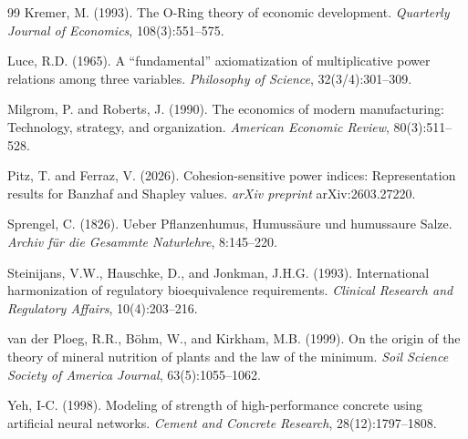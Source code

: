 \documentclass[12pt, a4paper]{article}
\theoremstyle{definition}
\theoremstyle{remark}
\begin{document}
\begin{thebibliography}{99}
Kremer, M. (1993). The O-Ring theory of economic development. \textit{Quarterly Journal of Economics}, 108(3):551--575.

Luce, R.D. (1965). A ``fundamental'' axiomatization of multiplicative power relations among three variables. \textit{Philosophy of Science}, 32(3/4):301--309.

Milgrom, P. and Roberts, J. (1990). The economics of modern manufacturing: Technology, strategy, and organization. \textit{American Economic Review}, 80(3):511--528.

Pitz, T. and Ferraz, V. (2026). Cohesion-sensitive power indices: Representation results for Banzhaf and Shapley values. \textit{arXiv preprint} arXiv:2603.27220.

Sprengel, C. (1826). Ueber Pflanzenhumus, Humuss\"aure und humussaure Salze. \textit{Archiv f\"ur die Gesammte Naturlehre}, 8:145--220.

Steinijans, V.W., Hauschke, D., and Jonkman, J.H.G. (1993). International harmonization of regulatory bioequivalence requirements. \textit{Clinical Research and Regulatory Affairs}, 10(4):203--216.

van der Ploeg, R.R., B\"ohm, W., and Kirkham, M.B. (1999). On the origin of the theory of mineral nutrition of plants and the law of the minimum. \textit{Soil Science Society of America Journal}, 63(5):1055--1062.

Yeh, I-C. (1998). Modeling of strength of high-performance concrete using artificial neural networks. \textit{Cement and Concrete Research}, 28(12):1797--1808.

\end{thebibliography}
\end{document}
